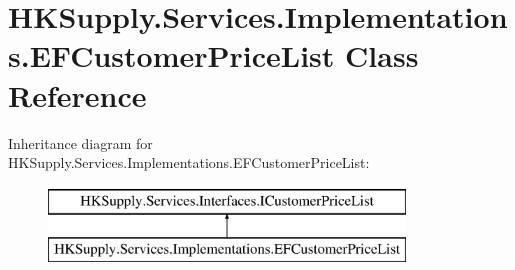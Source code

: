 \hypertarget{class_h_k_supply_1_1_services_1_1_implementations_1_1_e_f_customer_price_list}{}\section{H\+K\+Supply.\+Services.\+Implementations.\+E\+F\+Customer\+Price\+List Class Reference}
\label{class_h_k_supply_1_1_services_1_1_implementations_1_1_e_f_customer_price_list}
Inheritance diagram for H\+K\+Supply.\+Services.\+Implementations.\+E\+F\+Customer\+Price\+List\+:\begin{figure}[H]
\begin{center}
\leavevmode
\includegraphics[height=2.000000cm]{class_h_k_supply_1_1_services_1_1_implementations_1_1_e_f_customer_price_list}
\end{center}
\end{figure}
